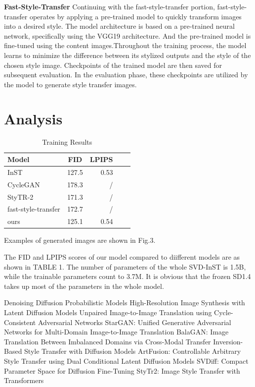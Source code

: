\documentclass[conference]{IEEEtran}
\begin{document}
\textbf{Fast-Style-Transfer} Continuing with the fast-style-transfer portion, fast-style-transfer operates by applying a pre-trained model to quickly transform images into a desired style. The model architecture is based on a pre-trained neural network, specifically using the VGG19 architecture. And the pre-trained model is fine-tuned using the content images.Throughout the training process, the model learns to minimize the difference between its stylized outputs and the style of the chosen style image. Checkpoints of the trained model are then saved for subsequent evaluation. In the evaluation phase, these checkpoints are utilized by the model to generate style transfer images.



\section{Analysis}



\begin{table}[h!]
  \begin{center}
    \caption{Training Results}
    \begin{tabular}{l|c|r|l|c} %
      \textbf{Model} & \textbf{FID} & \textbf{LPIPS}\\
      \hline
      InST &127.5& 0.53\\
CycleGAN& 178.3 &/\\
StyTR-2 &171.3& /\\
fast-style-transfer&172.7 &/\\
ours &125.1 &0.54
    \end{tabular}
  \end{center}
\end{table}
Examples of generated images are shown in Fig.3.

The FID and LPIPS scores of our model compared to diifferent models are as shown in TABLE 1. The number of parameters of the whole SVD-InST is 1.5B, while the trainable parameters count to 3.7M. It is obvious that the frozen SD1.4 takes up most of the parameters in the whole model.


\begin{thebibliography}{00}
Denoising Diffusion Probabilistic Models
High-Resolution Image Synthesis with Latent Diffusion Models
Unpaired Image-to-Image Translation using Cycle-Consistent Adversarial Networks
StarGAN: Unified Generative Adversarial Networks for Multi-Domain Image-to-Image Translation
BalaGAN: Image Translation Between Imbalanced Domains via Cross-Modal Transfer
Inversion-Based Style Transfer with Diffusion Models
ArtFusion: Controllable Arbitrary Style Transfer using Dual Conditional Latent Diffusion Models
SVDiff: Compact Parameter Space for Diffusion Fine-Tuning
StyTr2: Image Style Transfer with Transformers
\end{thebibliography}
\end{document}
